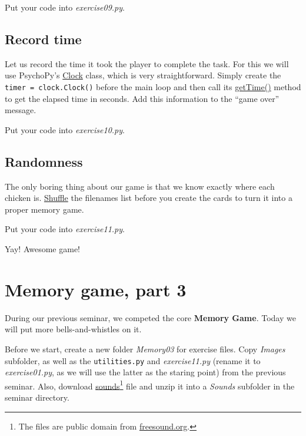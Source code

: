 \documentclass[
]{book}
\begin{document}
Put your code into \emph{exercise09.py}.

\hypertarget{record-time}{%
\section{Record time}\label{record-time}}

Let us record the time it took the player to complete the task. For this we will use PsychoPy's \href{https://psychopy.org/api/clock.html\#psychopy.clock.Clock}{Clock} class, which is very straightforward. Simply create the \texttt{timer\ =\ clock.Clock()} before the main loop and then call its \href{https://psychopy.org/api/clock.html\#psychopy.clock.MonotonicClock.getTime}{getTime()} method to get the elapsed time in seconds. Add this information to the ``game over'' message.

Put your code into \emph{exercise10.py}.

\hypertarget{randomness}{%
\section{Randomness}\label{randomness}}

The only boring thing about our game is that we know exactly where each chicken is. \href{https://docs.python.org/3/library/random.html\#random.shuffle}{Shuffle} the filenames list before you create the cards to turn it into a proper memory game.

Put your code into \emph{exercise11.py}.

Yay! Awesome game!

\hypertarget{seminar11}{%
\chapter{Memory game, part 3}\label{seminar11}}

During our previous seminar, we competed the core \textbf{Memory Game}. Today we will put more bells-and-whistles on it.

Before we start, create a new folder \emph{Memory03} for exercise files. Copy \emph{Images} subfolder, as well as the \texttt{utilities.py} and \emph{exercise11.py} (rename it to \emph{exercise01.py}, as we will use the latter as the staring point) from the previous seminar. Also, download \href{material/sound.zip}{sounds}\footnote{The files are public domain from \href{https://freesound.org/}{freesound.org}.} file and unzip it into a \emph{Sounds} subfolder in the seminar directory.
\end{document}

